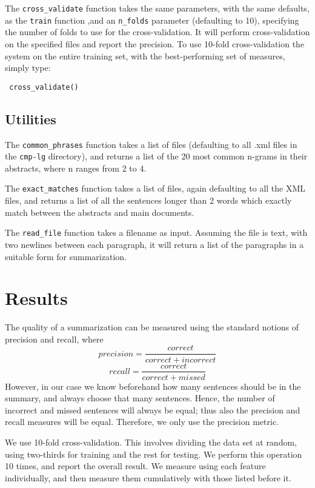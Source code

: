 \documentclass[a4paper, 10pt]{article}
\begin{document}
The \verb|cross_validate| function takes the same parameters, with the same defaults, as the \verb|train| function ,and an \verb|n_folds| parameter (defaulting to 10), specifying the number of folds to use for the cross-validation. It will perform cross-validation on the specified files and report the precision. To use 10-fold cross-validation the system on the entire training set, with the best-performing set of measures, simply type:
\begin{verbatim} cross_validate() \end{verbatim}

\subsection{Utilities}
The \verb|common_phrases| function takes a list of files (defaulting to all .xml files in the \verb|cmp-lg| directory), and returns a list of the 20 most common n-grams in their abstracts, where n ranges from 2 to 4.

The \verb|exact_matches| function takes a list of files, again defaulting to all the XML files, and returns a list of all the sentences longer than 2 words which exactly match between the abstracts and main documents.

The \verb|read_file| function takes a filename as input. Assuming the file is text, with two newlines between each paragraph, it will return a list of the paragraphs in a suitable form for summarization.

\section{Results}
The quality of a summarization can be measured using the standard notions of precision and recall, where 
\begin{equation} precision=\frac{correct}{correct+incorrect} \end{equation}
\begin{equation} recall=\frac{correct}{correct+missed} \end{equation}
However, in our case we know beforehand how many sentences should be in the summary, and always choose that many sentences. Hence, the number of incorrect and missed sentences will always be equal; thus also the precision and recall measures will be equal. Therefore, we only use the precision metric.

We use 10-fold cross-validation. This involves dividing the data set at random, using two-thirds for training and the rest for testing. 
We perform this operation 10 times, and report the overall result. We measure using each feature individually, and then measure them cumulatively with those listed before it.
\end{document}
